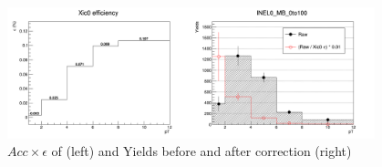 \paragraph{}\mbox{}\\[1pt]
 \\

\begin{figure}[h]
    \centering
    \includegraphics[width=0.95\textwidth]{plots/s2_Xic0Eff_INEL0_MB_0to100.png}
    \caption{$Acc \times \epsilon$ of \Xic (left) and Yields before and after correction (right)}
    \label{fig:s2_Xic0Eff}
\end{figure}


\paragraph{}\mbox{}\\[1pt]


\paragraph{}\mbox{}\\[1pt]

\clearpage

